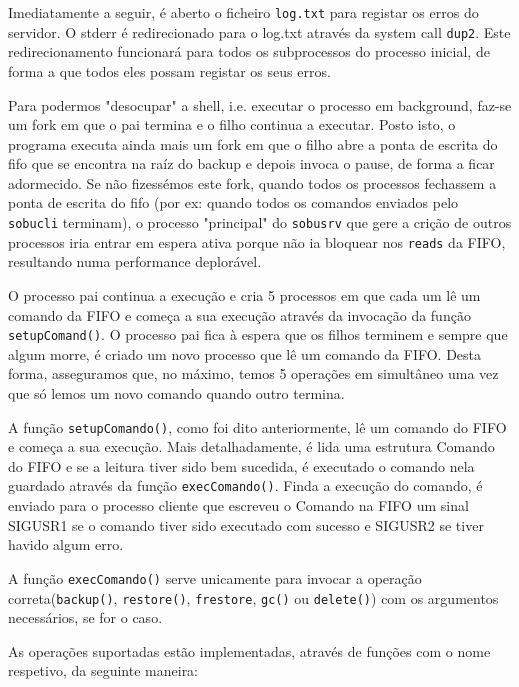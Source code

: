 \documentclass[a4paper,12pt,titlepage,draft,portuguese]{article}
\begin{document}
Imediatamente a seguir, é aberto o ficheiro \texttt{log.txt} para registar os erros do servidor. O stderr é redirecionado para o log.txt
através da system call \texttt{dup2}.
Este redirecionamento funcionará para todos os subprocessos do processo inicial, de forma a que todos eles possam registar os seus erros. 

Para podermos "desocupar" a shell, i.e. executar o processo em 
background, faz-se um fork em que o pai termina e o filho continua a executar. Posto isto, o programa executa ainda mais um fork em que o filho abre a ponta de escrita 
do fifo que se encontra na raíz do backup e depois invoca o pause, de forma a ficar adormecido.  
Se não fizessémos este fork, quando todos os processos fechassem a ponta de escrita do fifo (por ex: quando todos os comandos enviados pelo 
\texttt{sobucli} terminam), o processo "principal" do \texttt{sobusrv} que gere a crição de outros processos iria entrar em espera ativa porque não ia 
bloquear nos \texttt{reads} da FIFO, resultando numa performance deplorável. 

O processo pai continua a execução e cria 5 processos em que cada um lê um 
comando da FIFO e começa a sua execução através da invocação da função \texttt{setupComand()}. O processo pai fica à espera que os filhos terminem e sempre que algum
morre, é criado um novo processo que lê um comando da FIFO. Desta forma, asseguramos que, no máximo, temos 5 operações em simultâneo uma vez que só lemos um
novo comando quando outro termina. 

A função \texttt{setupComando()}, como foi dito anteriormente, lê um comando do FIFO e começa a sua execução. Mais detalhadamente, é lida uma estrutura 
Comando do FIFO e se a leitura tiver sido bem sucedida, é executado o comando nela guardado através da função \texttt{execComando()}. Finda a execução do comando,
é enviado para o processo cliente que escreveu o Comando na FIFO um sinal SIGUSR1 se o comando tiver sido executado com sucesso e SIGUSR2 se tiver havido algum
erro.

A função \texttt{execComando()} serve unicamente para invocar a operação correta(\texttt{backup()}, \texttt{restore()}, \texttt{frestore}, \texttt{gc()} ou \texttt{delete()})
com os argumentos necessários, se for o caso.

As operações suportadas estão implementadas, através de funções com o nome respetivo, da seguinte maneira:
\end{document}
